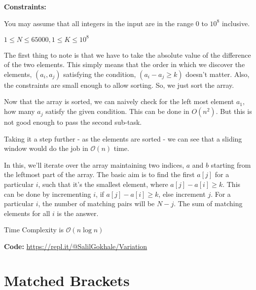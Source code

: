 \documentclass[twoside,12pt,a4paper,english]{book}
\theoremstyle{definition}
\theoremstyle{problemstyle}
\theoremstyle{problemstyle}
\theoremstyle{problemstyle}
\begin{document}
\textbf{Constraints:}

    You may assume that all integers in the input are in the range 0 to $10^8$ inclusive.
    
    $1 \leq N \leq 65000, 1 \leq K \leq 10^8$

\begin{tcolorbox}[title=Solution]
The first thing to note is that we have to take the absolute value of the difference of the two elements. This simply means that the order in which we discover the elements, $(a_i,a_j)$ satisfying the condition, $(a_i-a_j\geq k)$ doesn’t matter. Also, the constraints are small enough to allow sorting. So, we just sort the array.

\vspace{5mm}

Now that the array is sorted, we can naively check for the left most element $a_1$, how many $a_j$ satisfy the given condition. This can be done in $O(n^2)$. But this is not good enough to pass the second sub-task.

\vspace{5mm}

Taking it a step further - as the elements are sorted - we can see that a sliding window would do the job in $\mathcal{O}(n)$ time.

\vspace{5mm}

In this, we’ll iterate over the array maintaining two indices, $a$ and $b$ starting from the leftmost part of the array. The basic aim is to find the first $a[j]$ for a particular $i$, such that it’s the smallest element, where $a[j]-a[i]\geq k$. This can be done by incrementing $i$, if $a[j]-a[i]\geq k$, else increment $j$. For a particular $i$, the number of matching pairs will be $N-j$. The sum of matching elements for all $i$ is the answer.

\vspace{5mm}

Time Complexity is $\mathcal{O}(n\log{n})$

\vspace{5mm}

\textbf{Code: } \url{https://repl.it/@SalilGokhale/Variation}

\end{tcolorbox}

\newpage

\section{Matched Brackets}
\end{document}
